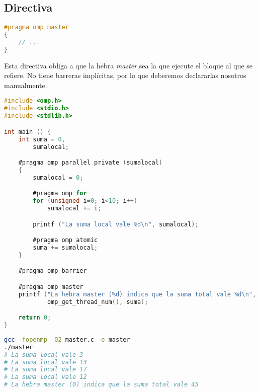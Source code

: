 \subsection{Directiva }\label{directivas-openmp-directivas}

\begin{lstlisting}[language=C]
#pragma omp master
{
	// ...
}
\end{lstlisting}

Esta directiva obliga a que la hebra \textit{master} sea la que ejecute el bloque al que se refiere.
No tiene barreras implícitas, por lo que deberemos declararlas nosotros manualmente.

\begin{lstlisting}[language=C]
#include <omp.h>
#include <stdio.h>
#include <stdlib.h>

int main () {
	int suma = 0,
	    sumalocal;

	#pragma omp parallel private (sumalocal)
	{
		sumalocal = 0;

		#pragma omp for
		for (unsigned i=0; i<10; i++)
			sumalocal += i;

		printf ("La suma local vale %d\n", sumalocal);

		#pragma omp atomic
		suma += sumalocal;
	}

	#pragma omp barrier

	#pragma omp master
	printf ("La hebra master (%d) indica que la suma total vale %d\n",
	        omp_get_thread_num(), suma);

	return 0;
}
\end{lstlisting}

\begin{lstlisting}[language=sh]
gcc -fopenmp -O2 master.c -o master
./master
# La suma local vale 3
# La suma local vale 13
# La suma local vale 17
# La suma local vale 12
# La hebra master (0) indica que la suma total vale 45
\end{lstlisting}
